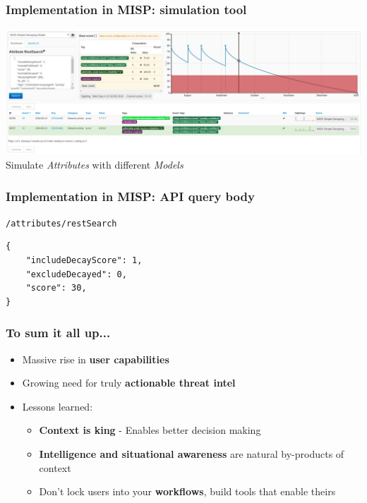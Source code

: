 \begin{frame}
    \frametitle{Implementation in MISP: simulation tool}
    \includegraphics[width=1.00\linewidth]{decaying-simulation.png}
    Simulate \textit{Attributes} with different \textit{Models}
\end{frame}

\begin{frame}[fragile]
    \frametitle{Implementation in MISP: API query body}
    \texttt{/attributes/restSearch}
    \begin{lstlisting}
{
    "includeDecayScore": 1,
    "excludeDecayed": 0,
    "score": 30,
}
    \end{lstlisting}
\end{frame}

\begin{frame}
  \frametitle{To sum it all up...}
  \begin{itemize}
     \item Massive rise in {\bf user capabilities}
     \item Growing need for truly {\bf actionable threat intel}
     \item Lessons learned:
     \begin{itemize}
	\item {\bf Context is king} - Enables better decision making
        \item {\bf Intelligence and situational awareness} are natural by-products of context
        \item Don't lock users into your {\bf workflows}, build tools that enable theirs
     \end{itemize}
  \end{itemize}
\end{frame}

